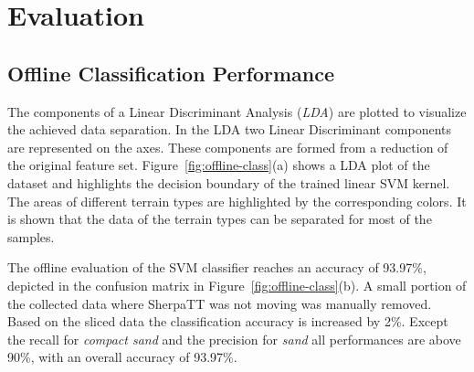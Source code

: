 \section{Evaluation}
\subsection{Offline Classification Performance}
The components of a Linear Discriminant Analysis (\emph{LDA}) are plotted to visualize the achieved data separation. 
In the LDA two Linear Discriminant components are represented on the axes. These components are formed from a reduction of the original feature set.
Figure~\ref{fig:offline-class}(a) shows a LDA plot of the dataset and highlights the decision boundary of the trained linear SVM kernel. 
The areas of different terrain types are highlighted by the corresponding colors. 
It is shown that the data of the terrain types can be separated for most of the samples.

The offline evaluation of the SVM classifier reaches an accuracy of 93.97\%, depicted in the confusion matrix in Figure~\ref{fig:offline-class}(b). 
A small portion of the collected data where SherpaTT was not moving was manually removed. 
Based on the sliced data the classification accuracy is increased by 2\%.
Except the recall for \emph{compact sand} and the precision for \emph{sand} all performances are above 90\%, with an overall accuracy of 93.97\%.

